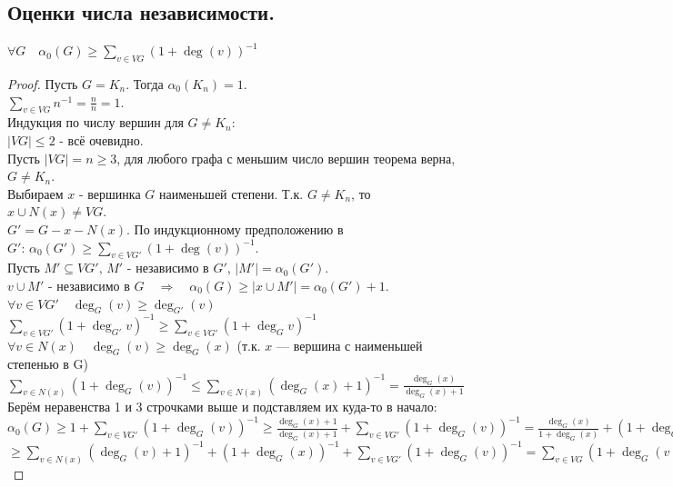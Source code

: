 \documentclass[12pt]{article}
\begin{document}
\subsection{Оценки числа независимости.}
	$ \displaystyle \forall G \quad \alpha_0(G) \ge \sum_{v \in VG} (1+ \operatorname{deg}(v))^{-1}$
	\begin{proof}
		Пусть $G = K_n$. Тогда $\alpha_0(K_n) = 1$.\\
		$ \displaystyle \sum_{v \in VG} n^{-1} = \frac{n}{n} = 1$.\\
		Индукция по числу вершин для $G\ne K_n$:\\
		$|VG| \le 2$ - всё очевидно.\\
		Пусть $|VG| = n \ge 3$, для любого графа с меньшим число вершин теорема верна, $ G \ne K_n$.\\
		Выбираем $x$ - вершинка $G$ наименьшей степени. Т.к. $ G \ne K_n$, то $x \cup N(x) \ne VG$.\\
		$G' = G - x - N(x)$. По индукционному предположению в $ \displaystyle G': \, \alpha_0(G') \ge \sum_{v \in VG'} (1+ \operatorname{deg}(v))^{-1}$.\\
		Пусть $M' \subseteq VG', \, M'$ - независимо в $G'$, $|M'| = \alpha_0(G')$.\\
		$v \cup M'$ - независимо в $G \quad  \Rightarrow  \quad \alpha_0(G) \ge |x \cup M'| = \alpha_0(G')+1$.\\
		$\forall v \in VG' \quad  \operatorname{deg}_G(v) \ge  \operatorname{deg}_{G'}(v)$\\
		$ \displaystyle \sum_{v \in VG'} (1+ \operatorname{deg}_{G'} v)^{-1} \ge\sum_{v \in VG'} (1+ \operatorname{deg}_{G} v)^{-1}$\\
		$\forall v \in N(x) \quad  \operatorname{deg}_G(v) \ge  \operatorname{deg}_G(x)$ (т.к. $x$ — вершина с наименьшей степенью в G)\\
		$ \displaystyle \sum_{v \in N(x)} (1+ \operatorname{deg}_G(v))^{-1} \le \sum_{v \in N(x)}( \operatorname{deg}_G(x)+1)^{-1} = \frac{ \operatorname{deg}_G(x)}{\operatorname{deg}_G(x)+1}$\\
		Берём неравенства 1 и 3 строчками выше и подставляем их куда-то в начало:\\
		$ \displaystyle \alpha_0(G) \ge 1 + \sum_{v \in VG'} (1+ \operatorname{deg}_G(v))^{-1} \ge \frac{ \operatorname{deg}_G(x)+1}{\operatorname{deg}_G(x)+1}+\sum_{v\in VG'}(1+ \operatorname{deg}_G(v))^{-1} = \frac{ \operatorname{deg}_G(x)}{1+\operatorname{deg}_G(x)} + (1+ \operatorname{deg}_G(x))^{-1} + \sum_{v \in VG'} (1+ \operatorname{deg}_G(v))^{-1}$
		$ \displaystyle \ge \sum_{v \in N(x)}( \operatorname{deg}_G(v)+1)^{-1} + (1+ \operatorname{deg}_G(x))^{-1} + \sum_{v \in VG'}(1 +  \operatorname{deg}_G(v))^{-1} = \sum_{v\in VG}(1+ \operatorname{deg}_G(v))^{-1}$
	\end{proof}
\end{document}
